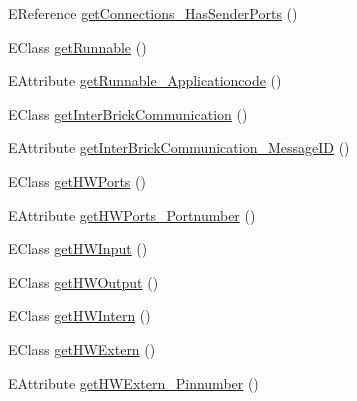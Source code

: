 \begin{DoxyCompactItemize}
\item 
E\-Reference \hyperlink{classshootingmachineemfmodel_1_1impl_1_1_shootingmachineemfmodel_package_impl_a534d0f6ac321df9ea722224b8c75ce53}{get\-Connections\-\_\-\-Has\-Sender\-Ports} ()
\item 
E\-Class \hyperlink{classshootingmachineemfmodel_1_1impl_1_1_shootingmachineemfmodel_package_impl_ab5b1e51f5d072672e318e4eb83d48e04}{get\-Runnable} ()
\item 
E\-Attribute \hyperlink{classshootingmachineemfmodel_1_1impl_1_1_shootingmachineemfmodel_package_impl_a524700ae80934bf154cbeec93667267f}{get\-Runnable\-\_\-\-Applicationcode} ()
\item 
E\-Class \hyperlink{classshootingmachineemfmodel_1_1impl_1_1_shootingmachineemfmodel_package_impl_a6dcf03b9cd465e27248a0278c6e55f11}{get\-Inter\-Brick\-Communication} ()
\item 
E\-Attribute \hyperlink{classshootingmachineemfmodel_1_1impl_1_1_shootingmachineemfmodel_package_impl_a52b993bce9574085ef39f2d1f45514d9}{get\-Inter\-Brick\-Communication\-\_\-\-Message\-I\-D} ()
\item 
E\-Class \hyperlink{classshootingmachineemfmodel_1_1impl_1_1_shootingmachineemfmodel_package_impl_a0e445554ec7e12a0acab69b315098594}{get\-H\-W\-Ports} ()
\item 
E\-Attribute \hyperlink{classshootingmachineemfmodel_1_1impl_1_1_shootingmachineemfmodel_package_impl_aacc8ccd1fdcf0a3828d6c4d8a4cd98ac}{get\-H\-W\-Ports\-\_\-\-Portnumber} ()
\item 
E\-Class \hyperlink{classshootingmachineemfmodel_1_1impl_1_1_shootingmachineemfmodel_package_impl_a2b76b45b62288e086096d893264e4232}{get\-H\-W\-Input} ()
\item 
E\-Class \hyperlink{classshootingmachineemfmodel_1_1impl_1_1_shootingmachineemfmodel_package_impl_ab435e9978a57a6482d01ba48fa8ca439}{get\-H\-W\-Output} ()
\item 
E\-Class \hyperlink{classshootingmachineemfmodel_1_1impl_1_1_shootingmachineemfmodel_package_impl_a4d79c0f3a00def45b86046e8908636e7}{get\-H\-W\-Intern} ()
\item 
E\-Class \hyperlink{classshootingmachineemfmodel_1_1impl_1_1_shootingmachineemfmodel_package_impl_aebd19ddfbfa5a16616e11c33e7d89eff}{get\-H\-W\-Extern} ()
\item 
E\-Attribute \hyperlink{classshootingmachineemfmodel_1_1impl_1_1_shootingmachineemfmodel_package_impl_a6150f0439546e113ac7b3f449ea00d2a}{get\-H\-W\-Extern\-\_\-\-Pinnumber} ()
\item 

\end{DoxyCompactItemize}
